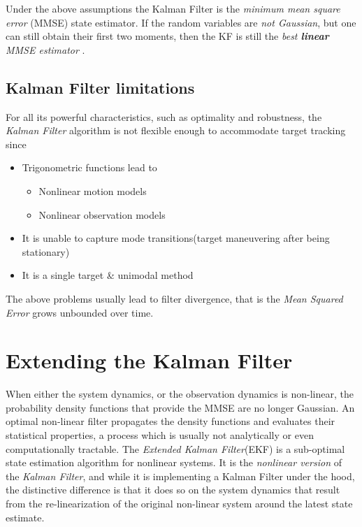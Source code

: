 Under the above assumptions the Kalman Filter is the \emph{minimum mean square error }(MMSE) state estimator. If the random variables are \emph{not Gaussian}, but one can still obtain their first two moments, then the KF is still the \emph{best \textbf{linear} MMSE estimator} \cite{Shalom1995}.

\subsection{Kalman Filter limitations}

For all its powerful characteristics, such as optimality and robustness, the \emph{Kalman Filter} algorithm is not flexible enough to accommodate target tracking \cite{Shalom1995} since

\begin{itemize}
	\item Trigonometric functions lead to
		\begin{itemize}
			\item Nonlinear motion models
			\item Nonlinear observation models
		\end{itemize}
	\item It is unable to capture mode transitions(target maneuvering after being stationary)
	\item It is a single target \& unimodal method
\end{itemize}

The above problems usually lead to filter divergence, that is the \emph{Mean Squared Error} grows unbounded over time.

\section{Extending the Kalman Filter}

When either the system dynamics, or the observation dynamics is non-linear, the probability density functions that provide the MMSE are no longer Gaussian. An optimal non-linear filter propagates the density functions and evaluates their statistical properties, a process which is usually not analytically or even computationally tractable. The \emph{Extended Kalman Filter}(EKF) is a sub-optimal state estimation algorithm for nonlinear systems. It is the \emph{nonlinear version} of the \emph{Kalman Filter}, and while it is implementing a Kalman Filter under the hood, the distinctive difference is that it does so on the system dynamics that result from the re-linearization of the original non-linear system around the latest state estimate.
